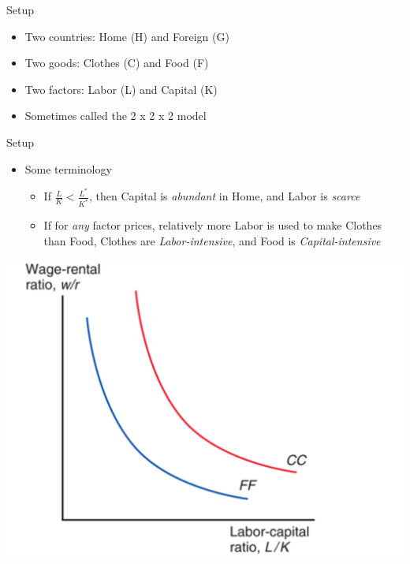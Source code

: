 \documentclass[ignorenonframetext,]{beamer}
\begin{document}
\begin{frame}{Setup}

        \begin{itemize}
            \item Two countries: Home (H) and Foreign (G)
            \item Two goods: Clothes (C) and Food (F)
            \item Two factors: Labor (L) and Capital (K)
            \item Sometimes called the 2 x 2 x 2 model
        \end{itemize}

\end{frame}

\begin{frame}{Setup}

        \begin{itemize}
            \item Some terminology
            \begin{itemize}
                \item If $\frac{L}{K} < \frac{L^*}{K^*}$, then Capital is \emph{abundant} in Home, and Labor is \emph{scarce}
                \item If for \emph{any} factor prices, relatively more Labor is used to make Clothes than Food, Clothes are \emph{Labor-intensive}, and Food is \emph{Capital-intensive}
            \end{itemize}
        \end{itemize}
    \includegraphics[scale=0.18]{relative_input_prices.png}

\end{frame}
\end{document}
